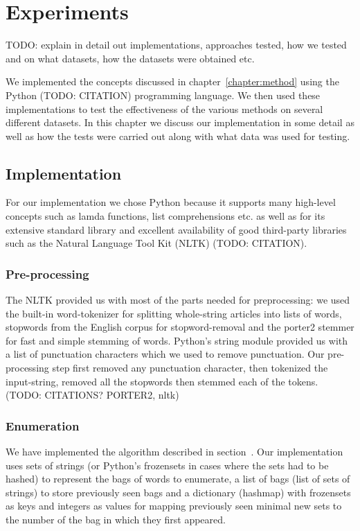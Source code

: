 \chapter{Experiments}
\label{chapter:experiments}
TODO: explain in detail out implementations, approaches tested, how we tested and on what datasets, how the datasets were obtained etc.

We implemented the concepts discussed in chapter~\ref{chapter:method} using the Python (TODO: CITATION) programming language. We then used these implementations to test the effectiveness of the various methods on several different datasets. In this chapter we discuss our implementation in some detail as well as how the tests were carried out along with what data was used for testing.

\section{Implementation}
For our implementation we chose Python because it supports many high-level concepts such as lamda functions, list comprehensions etc. as well as for its extensive standard library and excellent availability of good third-party libraries such as the Natural Language Tool Kit (NLTK) (TODO: CITATION).

\subsection{Pre-processing}
The NLTK provided us with most of the parts needed for preprocessing: we used the built-in word-tokenizer for splitting whole-string articles into lists of words,  stopwords from the English corpus for stopword-removal and the porter2 stemmer for fast and simple stemming of words. Python's string module provided us with a list of punctuation characters which we used to remove punctuation. Our pre-processing step first removed any punctuation character, then tokenized the input-string, removed all the stopwords then stemmed each of the tokens. (TODO: CITATIONS? PORTER2, nltk)

\subsection{Enumeration}
We have implemented the algorithm described in section~\label{method:enumeration}. Our implementation uses sets of strings (or Python's frozensets in cases where the sets had to be hashed) to represent the bags of words to enumerate, a list of bags (list of sets of strings) to store previously seen bags and a dictionary (hashmap) with frozensets as keys and integers as values for mapping previously seen minimal new sets to the number of the bag in which they first appeared.

